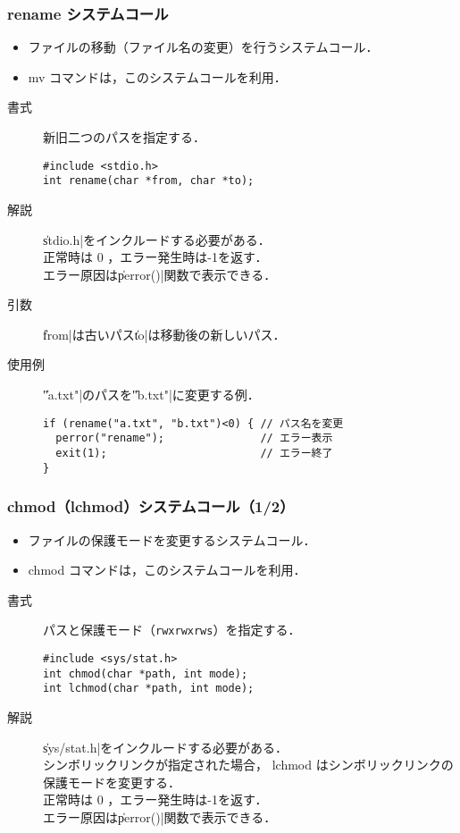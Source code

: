 \documentclass{beamer}                 %
\begin{document}
\begin{frame}[fragile]
  \frametitle{rename システムコール}
  \begin{itemize}
  \item ファイルの移動（ファイル名の変更）を行うシステムコール．
  \item mv コマンドは，このシステムコールを利用．
  \end{itemize}

  \begin{description}
  \item[書式] 新旧二つのパスを指定する．
\begin{verbatim}
#include <stdio.h>
int rename(char *from, char *to);
\end{verbatim}

  \item[解説] \|stdio.h|をインクルードする必要がある．\\
    正常時は 0 ，エラー発生時は-1を返す．\\
    エラー原因は\|perror()|関数で表示できる．

  \item[引数] \|from|は古いパス\|to|は移動後の新しいパス．

\item[使用例] \|"a.txt"|のパスを\|"b.txt"|に変更する例．
\begin{verbatim}
if (rename("a.txt", "b.txt")<0) { // パス名を変更
  perror("rename");               // エラー表示
  exit(1);                        // エラー終了
}
\end{verbatim}
\end{description}
\end{frame}

\begin{frame}[fragile]
  \frametitle{chmod（lchmod）システムコール（1/2）}
  \begin{itemize}
  \item ファイルの保護モードを変更するシステムコール．
  \item chmod コマンドは，このシステムコールを利用．
  \end{itemize}

  \begin{description}
  \item[書式] パスと保護モード（\texttt{rwxrwxrws}）を指定する．
\begin{verbatim}
#include <sys/stat.h>
int chmod(char *path, int mode);
int lchmod(char *path, int mode);
\end{verbatim}

  \item[解説] \|sys/stat.h|をインクルードする必要がある．\\
    シンボリックリンクが指定された場合，
    lchmod はシンボリックリンクの保護モードを変更する．\\
    正常時は 0 ，エラー発生時は-1を返す．\\
    エラー原因は\|perror()|関数で表示できる．
  \end{description}
\end{frame}
\end{document}
